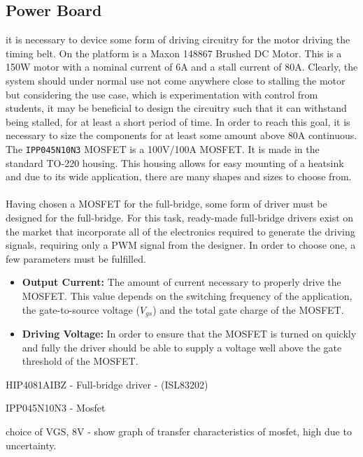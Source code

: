 \subsection{Power Board} %
\label{sub:power_board}
it is necessary to device some form of driving circuitry for the motor driving the timing belt.
On the platform is a Maxon 148867 Brushed DC Motor.
This is a 150W motor with a nominal current of 6A and a stall current of 80A.
Clearly, the system should under normal use not come anywhere close to stalling the motor but considering the use case, which is experimentation with control from students, it may be beneficial to design the circuitry such that it can withstand being stalled, for at least a short period of time.
In order to reach this goal, it is necessary to size the components for at least some amount above 80A continuous.
The \texttt{IPP045N10N3} MOSFET \cite{mosfet} is a 100V/100A MOSFET.
It is made in the standard TO-220 housing.
This housing allows for easy mounting of a heatsink and due to its wide application, there are many shapes and sizes to choose from.
\\~\\
Having chosen a MOSFET for the full-bridge, some form of driver must be designed for the full-bridge.
For this task, ready-made full-bridge drivers exist on the market that incorporate all of the electronics required to generate the driving signals, requiring only a PWM signal from the designer.
In order to choose one, a few parameters must be fulfilled.

\begin{itemize}
	\item \textbf{Output Current:} The amount of current necessary to properly drive the MOSFET.
	This value depends on the switching frequency of the application, the gate-to-source voltage ($V_{gs}$) and the total gate charge of the MOSFET.
	\item \textbf{Driving Voltage:} In order to ensure that the MOSFET is turned on quickly and fully the driver should be able to supply a voltage well above the gate threshold of the MOSFET. 
\end{itemize}

HIP4081AIBZ - Full-bridge driver - (ISL83202)

IPP045N10N3 - Mosfet

choice of VGS, 8V - show graph of transfer characteristics of mosfet, high due to uncertainty.

